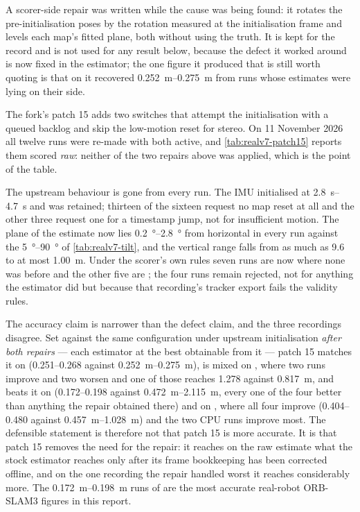 \documentclass[11pt,a4paper,notitlepage]{report}
\begin{document}
A scorer-side repair was written while the cause was being found: it rotates
the pre-initialisation poses by the rotation measured at the initialisation
frame and levels each map's fitted plane, both without using the truth.
It is kept for the record and is not used
for any result below, because the defect it worked around is now fixed in the
estimator; the one figure it produced that is still worth quoting is that on
 it recovered \SIrange{0.252}{0.275}{\metre} from runs whose
estimates were lying on their side.

The fork's patch 15 adds two switches that attempt the initialisation with a
queued backlog and skip the low-motion reset for stereo. On 11 November 2026
all twelve runs were re-made with both active, and
\cref{tab:realv7-patch15} reports them scored \emph{raw}: neither of the two
repairs above was applied, which is the point of the table.

The upstream behaviour is gone from every run. The IMU initialised at
\SIrange{2.8}{4.7}{\second} and was retained; thirteen of the sixteen request
no map reset at all and the other three request one for a timestamp jump, not
for insufficient motion. The plane of the estimate now lies
\SIrange{0.2}{2.8}{\degree} from horizontal in every run against the
\SIrange{5}{90}{\degree} of \cref{tab:realv7-tilt}, and the vertical range
falls from as much as \SI{9.6}{} to at most \SI{1.00}{\metre}. Under the
scorer's own rules seven  runs are now  where
none was before and the other five are ; the four
 runs remain rejected, not for anything the estimator did but
because that recording's tracker export fails the validity rules.

The accuracy claim is narrower than the defect claim, and the three recordings
disagree. Set against the same configuration under upstream initialisation
\emph{after both repairs} --- each estimator at the best obtainable from it ---
patch 15 matches it on  (\SIrange{0.251}{0.268}{} against
\SIrange{0.252}{0.275}{\metre}), is mixed on , where two runs
improve and two worsen and one of those reaches \SI{1.278}{} against
\SI{0.817}{\metre}, and beats it on 
(\SIrange{0.172}{0.198}{} against \SIrange{0.472}{2.115}{\metre}, every one
of the four better than anything the repair obtained there) and on
, where all four improve
(\SIrange{0.404}{0.480}{} against \SIrange{0.457}{1.028}{\metre}) and the two
CPU runs improve most. The
defensible statement is therefore not that patch 15 is more accurate. It is
that patch 15 removes the need for the repair: it reaches on the raw estimate
what the stock estimator reaches only after its frame bookkeeping has been
corrected offline, and on the one recording the repair handled worst it
reaches considerably more. The
\SIrange{0.172}{0.198}{\metre} runs of  are the most accurate
real-robot ORB-SLAM3 figures in this report.
\end{document}
